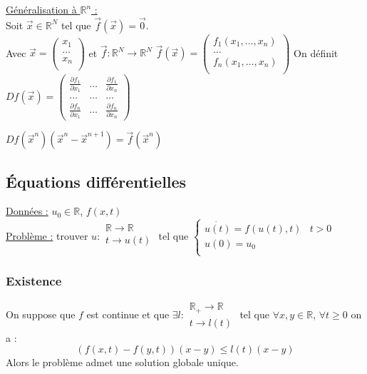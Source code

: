 \documentclass[../main.tex]{subfiles}
\begin{document}
\quad \underline{Généralisation à $\mathbb{R}^n$ :}\\
Soit $\Vec{x}\in \mathbb{R}^N$ tel que $\Vec{f}(\Vec{x}) = \Vec{0}$. \\
Avec $\Vec{x} = \begin{pmatrix} x_1\\ \dots \\ x_n \\\end{pmatrix}$ et $\Vec{f}:\mathbb{R}^N \rightarrow \mathbb{R}^N$ $\Vec{f}(\Vec{x}) = \begin{pmatrix}
    f_1(x_1, \dots, x_n)\\ \dots \\ f_n(x_1, \dots, x_n)\\
\end{pmatrix}$
On définit $Df(\Vec{x}) = \begin{pmatrix}
    \frac{\partial f_1}{\partial x_1} & \dots & \frac{\partial f_1}{\partial x_n}\\
    \dots & \dots & \dots\\
    \frac{\partial f_n}{\partial x_1} & \dots & \frac{\partial f_n}{\partial x_n}
\end{pmatrix}$

$Df(\Vec{x}^n) (\Vec{x}^n-\Vec{x}^{n+1}) = \Vec{f}(\Vec{x}^n)$\\

\subsection{Équations différentielles}
\quad \underline{Données :} $u_0 \in \mathbb{R}$, $f(x,t)$\\

\quad \underline{Problème :} trouver $u : \begin{matrix}
    \mathbb{R} \rightarrow \mathbb{R}\\
    t \rightarrow u(t)\\
\end{matrix} $ tel que $ \begin{cases} \dot{u(t)} = f(u(t),t) & t>0\\ u(0) = u_0 & \\ \end{cases}$\\

\subsubsection{Existence}
\begin{theorem}

On suppose que $f$ est continue et que $\exists l : \begin{matrix} \mathbb{R}_+ \rightarrow \mathbb{R}\\ t\rightarrow l(t)\end{matrix}$ tel que $\forall x,y \in \mathbb{R}$, $\forall t\geq 0$ on a :\\
\begin{equation}
    (f(x,t)-f(y,t))(x-y) \leq l(t)(x-y)
\end{equation}
Alors le problème admet une solution globale unique.
\end{theorem}
\end{document}
